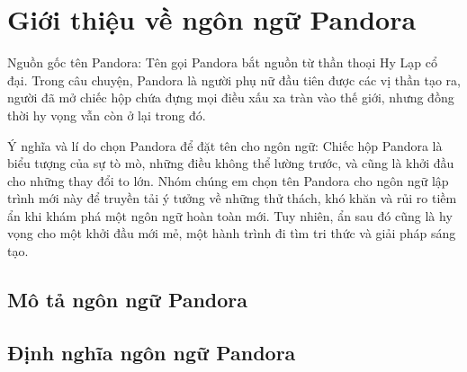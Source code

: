 \section{Giới thiệu về ngôn ngữ Pandora}
Nguồn gốc tên Pandora: 
    Tên gọi Pandora bắt nguồn từ thần thoại 
    Hy Lạp cổ đại. Trong câu chuyện, Pandora là người phụ nữ đầu tiên được 
    các vị thần tạo ra, người đã mở chiếc hộp chứa đựng mọi điều xấu xa tràn 
    vào thế giới, nhưng đồng thời hy vọng vẫn còn ở lại trong đó.

Ý nghĩa và lí do chọn Pandora để đặt tên cho ngôn ngữ: 
    Chiếc hộp Pandora là biểu tượng của sự tò mò, những điều không thể 
    lường trước, và cũng là khởi đầu cho những thay đổi to lớn. Nhóm chúng 
    em chọn tên Pandora cho ngôn ngữ lập trình mới này để truyền tải ý 
    tưởng về những thử thách, khó khăn và rủi ro tiềm ẩn khi khám phá một 
    ngôn ngữ hoàn toàn mới. Tuy nhiên, ẩn sau đó cũng là hy vọng cho một 
    khởi đầu mới mẻ, một hành trình đi tìm tri thức và giải pháp sáng tạo.


\subsection{Mô tả ngôn ngữ Pandora}
\subsection{Định nghĩa ngôn ngữ Pandora}



